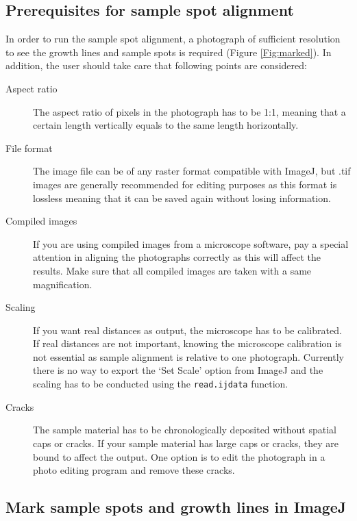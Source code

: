 \documentclass[11pt, a4paper]{article}
\begin{document}
\subsection{Prerequisites for sample spot alignment}

In order to run the sample spot alignment, a photograph of sufficient resolution to see the growth lines and sample spots is required (Figure \ref{Fig:marked}). In addition, the user should take care that following points are considered:

\begin{description}
\item[Aspect ratio] The aspect ratio of pixels in the photograph has to be 1:1, meaning that a certain length vertically equals to the same length horizontally. 
\item[File format] The image file can be of any raster format compatible with ImageJ, but .tif images are generally recommended for editing purposes as this format is lossless meaning that it can be saved again without losing information. %
\item[Compiled images] If you are using compiled images from a microscope software, pay a special attention in aligning the photographs correctly as this will affect the results. Make sure that all compiled images are taken with a same magnification.
\item[Scaling] If you want real distances as output, the microscope has to be calibrated. If real distances are not important, knowing the microscope calibration is not essential as sample alignment is relative to one photograph. Currently there is no way to export the `Set Scale' option from ImageJ and the scaling has to be conducted using the \texttt{read.ijdata} function.
\item[Cracks] The sample material has to be chronologically deposited without spatial caps or cracks. If your sample material has large caps or cracks, they are bound to affect the output. One option is to edit the photograph in a photo editing program and remove these cracks.
\end{description}

\subsection{Mark sample spots and growth lines in ImageJ}
\end{document}
